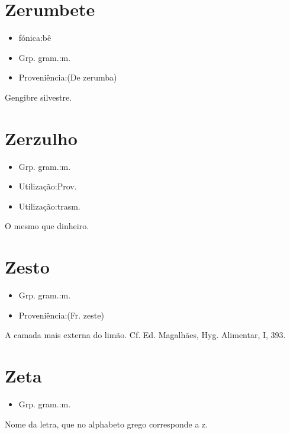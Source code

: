 \section{Zerumbete}
\begin{itemize}
\item {fónica:bê}
\end{itemize}
\begin{itemize}
\item {Grp. gram.:m.}
\end{itemize}
\begin{itemize}
\item {Proveniência:(De \textunderscore zerumba\textunderscore )}
\end{itemize}
Gengibre silvestre.
\section{Zerzulho}
\begin{itemize}
\item {Grp. gram.:m.}
\end{itemize}
\begin{itemize}
\item {Utilização:Prov.}
\end{itemize}
\begin{itemize}
\item {Utilização:trasm.}
\end{itemize}
O mesmo que \textunderscore dinheiro\textunderscore .
\section{Zesto}
\begin{itemize}
\item {Grp. gram.:m.}
\end{itemize}
\begin{itemize}
\item {Proveniência:(Fr. \textunderscore zeste\textunderscore )}
\end{itemize}
A camada mais externa do limão. Cf. Ed. Magalhães, \textunderscore Hyg. Alimentar\textunderscore , I, 393.
\section{Zeta}
\begin{itemize}
\item {Grp. gram.:m.}
\end{itemize}
Nome da letra, que no alphabeto grego corresponde a \textunderscore z\textunderscore .

